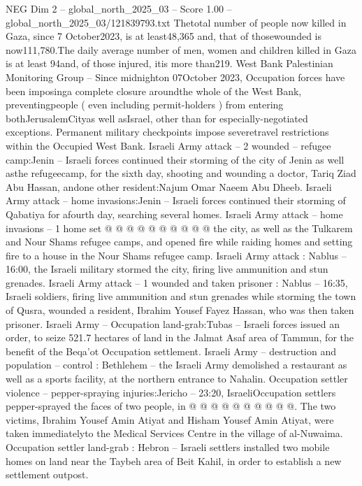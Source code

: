 \begin{textsample}{NEG Dim 2 – global\_north\_2025\_03 – Score 1.00 – global\_north\_2025\_03/121839793.txt}  \label{ex:f2_neg_033}
Thetotal number of people now killed in Gaza, since 7 October2023, is at least48,365 and, that of thosewounded is now111,780.The daily average number of men, women and children killed in Gaza is at least 94and, of those injured, itis more than219.
West Bank Palestinian Monitoring Group -- Since midnighton 07October 2023, Occupation forces have been imposinga complete closure aroundthe whole of the West Bank, preventingpeople ( even including permit-holders ) from entering bothJerusalemCityas well asIsrael, other than for especially-negotiated exceptions.
Permanent military checkpoints impose severetravel restrictions within the Occupied West Bank.
Israeli Army attack -- 2 wounded -- refugee camp:Jenin -- Israeli forces continued their storming of the city of Jenin as well asthe refugeecamp, for the sixth day, shooting and wounding a doctor, Tariq Ziad Abu Hassan, andone other resident:Najum Omar Naeem Abu Dheeb.
Israeli Army attack -- home invasions:Jenin -- Israeli forces continued their storming of Qabatiya for afourth day, searching several homes.
Israeli Army attack -- home invasions -- 1 home set @ @ @ @ @ @ @ @ @ @ the city, as well as the Tulkarem and Nour Shams refugee camps, and opened fire while raiding homes and setting fire to a house in the Nour Shams refugee camp.
Israeli Army attack : Nablus -- 16:00, the Israeli military stormed the city, firing live ammunition and stun grenades.
Israeli Army attack -- 1 wounded and taken prisoner : Nablus -- 16:35, Israeli soldiers, firing live ammunition and stun grenades while storming the town of Qusra, wounded a resident, Ibrahim Yousef Fayez Hassan, who was then taken prisoner.
Israeli Army -- Occupation land-grab:Tubas -- Israeli forces issued an order, to seize 521.7 hectares of land in the Jalmat Asaf area of Tammun, for the benefit of the Beqa'ot Occupation settlement.
Israeli Army -- destruction and population -- control : Bethlehem -- the Israeli Army demolished a restaurant as well as a sports facility, at the northern entrance to Nahalin.
Occupation settler violence -- pepper-spraying injuries:Jericho -- 23:20, IsraeliOccupation settlers pepper-sprayed the faces of two people, in @ @ @ @ @ @ @ @ @ @.
The two victims, Ibrahim Yousef Amin Atiyat and Hisham Yousef Amin Atiyat, were taken immediatelyto the Medical Services Centre in the village of al-Nuwaima.
Occupation settler land-grab : Hebron -- Israeli settlers installed two mobile homes on land near the Taybeh area of Beit Kahil, in order to establish a new settlement outpost.

\end{textsample}
